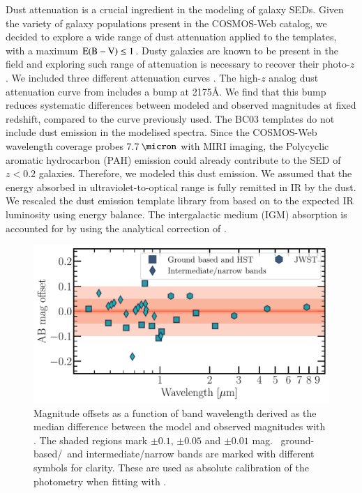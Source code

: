 \documentclass[longauth]{aa}
\begin{document}
Dust attenuation is a crucial ingredient in the modeling of galaxy SEDs. Given the variety of galaxy populations present in the COSMOS-Web catalog, we decided to explore a wide range of dust attenuation applied to the templates, with a maximum $\rm{E(B-V)}\leq1$. Dusty galaxies are known to be present in the field \citep[e.g.,][]{McKinney_scubaDive_2024} and exploring such range of attenuation is necessary to recover their photo-$z$. We included three different attenuation curves \citep{calzetti_dust_2000, arnouts_NRK_2013, salim_dust_2018}. The high-$z$ analog dust attenuation curve from \citet{salim_dust_2018} includes a bump at 2175{\AA}. We find that this bump reduces systematic differences between modeled and observed magnitudes at fixed redshift, compared to the \citet{prevot_typical_1984} curve previously used. The BC03 templates do not include dust emission in the modelised spectra. Since the COSMOS-Web wavelength coverage probes 7.7$\mum$ with  MIRI imaging, the Polycyclic aromatic hydrocarbon (PAH) emission could already contribute to the SED of $z<0.2$ galaxies. Therefore, we modeled this dust emission. We assumed that the energy absorbed in ultraviolet-to-optical range is fully remitted in IR by the dust. We rescaled the dust emission template library from \citet{bethermin_2012} based on \citet{magdis_2012} to the expected IR luminosity using energy balance. The intergalactic medium (IGM) absorption is accounted for by using the analytical correction of \citet{madau_opa_1995}. 


\begin{figure}[t!]
\includegraphics[width=1\columnwidth]{figures/LePhare-mag-offsets.pdf}
\caption{Magnitude offsets as a function of band wavelength derived as the median difference between the model and observed magnitudes with \lephare. The shaded regions mark $\pm 0.1$, $\pm 0.05$ and $\pm 0.01$ mag. \JWST\, ground-based/\hst\ and intermediate/narrow bands are marked with different symbols for clarity. These are used as absolute calibration of the photometry when fitting with \lephare.}
\label{fig:mag-offsets}
\end{figure}
\end{document}

